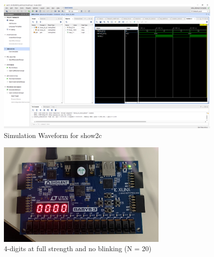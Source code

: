 \documentclass[11pt]{article}
\begin{document}
\begin{figure}[ht]\centering
	\caption{Simulation Waveform for show2c}
	\includegraphics [width=1\textwidth,trim=640 550 10 135, clip]{show_2c_sim}
\end{figure}

\begin{figure}[ht]\centering
	\caption{4-digits at full strength and no blinking (N = 20)}
	\includegraphics [width=0.75\textwidth,trim=0 0 0 0, clip]{pic1}
\end{figure}
\end{document}
